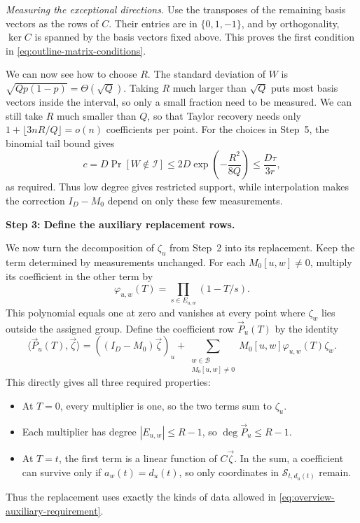\documentclass[11pt,reqno]{amsart}
\numberwithin{equation}{section}
\theoremstyle{definition}\newtheorem{definition}[theorem]{Definition}
\theoremstyle{remark}\newtheorem{remark}[theorem]{Remark}
\renewcommand{\le}{\leqslant}
\begin{document}
\smallskip\noindent
\emph{Measuring the exceptional directions.}
Use the transposes of the remaining basis vectors as the rows of
$C$. Their entries are in $\{0,1,-1\}$, and by orthogonality,
$\ker C$ is spanned by the basis vectors fixed above.
This proves the first condition in
\eqref{eq:outline-matrix-conditions}.

We can now see how to choose $R$. The standard deviation of $W$ is
$\sqrt{Qp(1-p)}=\Theta(\sqrt Q)$. Taking $R$ much larger than
$\sqrt Q$ puts most basis vectors inside the interval, so only a
small fraction need to be measured. We can still take $R$ much
smaller than $Q$, so that Taylor recovery needs only
$1+\lfloor 3nR/Q\rfloor=o(n)$ coefficients per point.
For the choices in Step~5, the binomial tail bound gives
\[
 c=D\Pr[W\notin\mathcal I]
      \le 2D\exp\!\left(-\frac{R^2}{8Q}\right)
      \le\frac{D\tau}{3r},
\]
as required. Thus low degree gives restricted support, while
interpolation makes the correction $I_D-M_0$ depend on only
these few measurements.

\medskip\noindent
\textbf{Step 3: Define the auxiliary replacement rows.}\par\nobreak
\smallskip\noindent
We now turn the decomposition of $\zeta_u$ from Step~2 into its
replacement. Keep the term determined by measurements unchanged.
For each $M_0[u,w]\ne0$, multiply its coefficient in the other
term by
\[
 \varphi_{u,w}(T)=\prod_{s\in E_{u,w}}(1-T/s).
\]
This polynomial equals one at zero and vanishes at every point
where $\zeta_w$ lies outside the assigned group. Define the
coefficient row $\vec P_u(T)$ by the identity
\begin{equation}\label{eq:outline-auxiliary-row}
 \langle\vec P_u(T),\vec\zeta\rangle
 =((I_D-M_0)\vec\zeta)_u+
   \sum_{\substack{w\in\mathcal B\\M_0[u,w]\ne0}}
                M_0[u,w]\varphi_{u,w}(T)\zeta_w.
\end{equation}
This directly gives all three required properties:
\begin{itemize}
\item At $T=0$, every multiplier is one, so the two terms sum to
$\zeta_u$.
\item Each multiplier has degree $|E_{u,w}|\le R-1$, so
$\deg\vec P_u\le R-1$.
\item At $T=t$, the first term is a linear function of $C\vec\zeta$.
In the sum, a coefficient can survive only if
$a_w(t)=d_u(t)$, so only coordinates in
$\mathcal S_{t,d_u(t)}$ remain.
\end{itemize}
Thus the replacement uses exactly the kinds of data allowed in
\eqref{eq:overview-auxiliary-requirement}.
\end{document}
